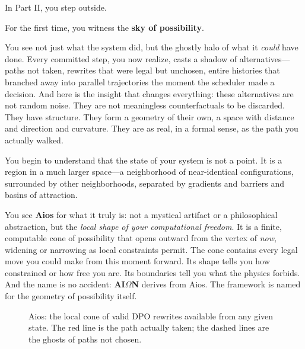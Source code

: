 In Part II, you step outside.

For the first time, you witness the \textbf{sky of possibility}.

You see not just what the system did, but the ghostly halo of what it \emph{could} have done. Every committed step, you now realize, casts a shadow of alternatives---paths not taken, rewrites that were legal but unchosen, entire histories that branched away into parallel trajectories the moment the scheduler made a decision. And here is the insight that changes everything: these alternatives are not random noise. They are not meaningless counterfactuals to be discarded. They have structure. They form a geometry of their own, a space with distance and direction and curvature. They are as real, in a formal sense, as the path you actually walked.

You begin to understand that the state of your system is not a point. It is a region in a much larger space---a neighborhood of near-identical configurations, surrounded by other neighborhoods, separated by gradients and barriers and basins of attraction.

You see \textbf{Aios} for what it truly is: not a mystical artifact or a philosophical abstraction, but the \emph{local shape of your computational freedom}. It is a finite, computable cone of possibility that opens outward from the vertex of \emph{now}, widening or narrowing as local constraints permit. The cone contains every legal move you could make from this moment forward. Its shape tells you how constrained or how free you are. Its boundaries tell you what the physics forbids. And the name is no accident: \textbf{AI$\Omega$N} derives from Aios. The framework is named for the geometry of possibility itself.

\begin{figure}[h]
    \centering
    \caption{Aios: the local cone of valid DPO rewrites available from any given state. The red line is the path actually taken; the dashed lines are the ghosts of paths not chosen.}
\end{figure}

